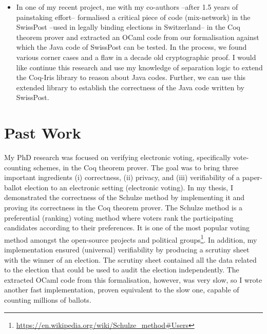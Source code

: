 \documentclass[a4paper]{article}
\begin{document}
\begin{itemize}
\item In one of my recent project, me with my co-authors --after 1.5 years of 
painstaking effort-- formalised a critical 
piece of code (mix-network) in the SwissPost --used in legally binding elections 
in Switzerland-- in the Coq theorem prover and extracted an OCaml code from our 
formalisation against which the Java code of SwissPost can be tested. 
In the process, we found various corner cases and a flaw in a decade old cryptographic proof. 
I would like continue this research and use my knowledge of separation logic to 
extend the Coq-Iris library to reason about Java codes. Further, we can use this extended library 
to establish the correctness of the Java code written by SwissPost.

\end{itemize}	

\section{Past Work}
My PhD research was focused on verifying electronic voting, specifically vote-counting schemes, in 
the Coq theorem prover. The goal was to 
bring  three important ingredients (i) correctness, (ii) privacy, and (iii) verifiability of a 
paper-ballot election to 
an electronic setting (electronic voting).
In my thesis, I demonstrated the correctness of the Schulze method 
by implementing it and proving its correctness in the Coq theorem 
prover. The Schulze method is a preferential (ranking) voting method where voters rank the participating 
candidates according to their preferences. It is one of the most popular voting method amongst the open-source projects and 
political groups\footnote{\url{https://en.wikipedia.org/wiki/Schulze_method#Users}}.
In addition, my implementation 
ensured (universal) verifiability by producing a scrutiny sheet 
with the winner of an election. The scrutiny sheet contained all the data related 
to the election that could be used to audit the election independently. 
The extracted OCaml code from this formalisation, however, was 
very slow, so I wrote another fast implementation, proven equivalent to the slow one,
capable of counting millions of ballots.
\end{document}
